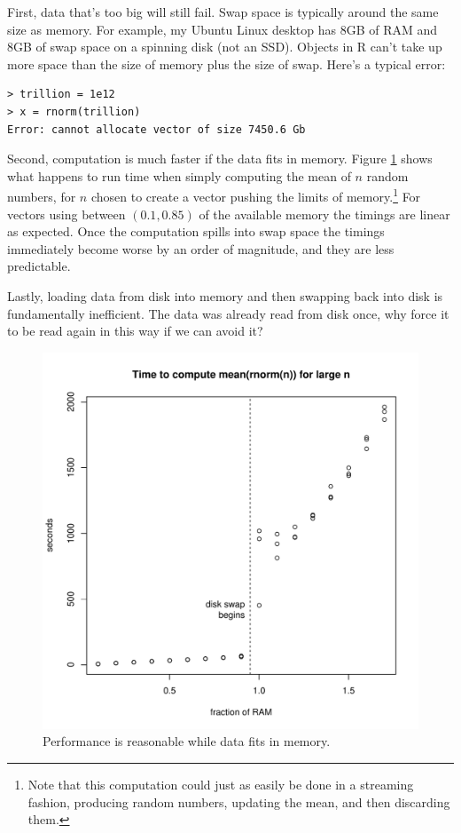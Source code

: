 \documentclass[12pt]{article}
\begin{document}
First, data that's too big will still fail. Swap space is typically
around the same size as memory. For example, my Ubuntu Linux desktop has
8GB of RAM and 8GB of swap space on a spinning disk (not an SSD). Objects
in R can't take up more space than the size of memory plus the size of
swap. Here's a typical error:

\begin{verbatim}
> trillion = 1e12
> x = rnorm(trillion)
Error: cannot allocate vector of size 7450.6 Gb
\end{verbatim}

Second, computation is much faster if the data fits in memory.
Figure \ref{fig:spinning_disk_swap} shows what happens to run time when
simply computing the mean of $n$ random numbers, for $n$ chosen to create a
vector pushing the limits of memory.\footnote{Note that this computation
could just as easily be done in a streaming fashion, producing random
numbers, updating the mean, and then discarding them.} For vectors using between $(0.1, 0.85)$
of the available memory the timings are linear as expected.
Once the computation spills into swap space the timings immediately become
worse by an order of magnitude, and they are less predictable.

Lastly, loading data from disk into memory and then swapping back into disk
is fundamentally inefficient. The data was already read from disk once, why force it
to be read again in this way if we can avoid it?

\begin{figure}
\centering
\includegraphics[width=.8\linewidth]{swap/spinning_disk_swap}
\caption{Performance is reasonable while data fits in memory.}
\label{fig:spinning_disk_swap}
\end{figure}
\end{document}
